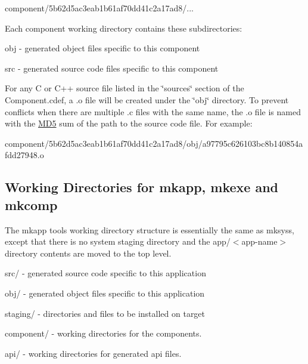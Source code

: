 \begin{DoxyItemize}
\item component/5b62d5ac3eab1b61af70dd41c2a17ad8/...
\end{DoxyItemize}

Each component working directory contains these subdirectories\+:


\begin{DoxyItemize}
\item obj -\/ generated object files specific to this component
\item src -\/ generated source code files specific to this component
\end{DoxyItemize}

For any C or C++ source file listed in the \char`\"{}sources\char`\"{} section of the Component.\+cdef, a .o file will be created under the \char`\"{}obj\char`\"{} directory. To prevent conflicts when there are multiple .c files with the same name, the .o file is named with the \hyperlink{class_m_d5}{M\+D5} sum of the path to the source code file. For example\+:


\begin{DoxyItemize}
\item component/5b62d5ac3eab1b61af70dd41c2a17ad8/obj/a97795c626103bc8b140854afdd27948.\+o
\end{DoxyItemize}\hypertarget{mkToolsDesign_mkToolsDesign_workingDirs_app_exe_comp}{}\subsection{Working Directories for mkapp, mkexe and mkcomp}\label{mkToolsDesign_mkToolsDesign_workingDirs_app_exe_comp}
The mkapp tool\textquotesingle{}s working directory structure is essentially the same as mksys\textquotesingle{}s, except that there is no system staging directory and the \textquotesingle{}app/$<$app-\/name$>$\textquotesingle{} directory contents are moved to the top level.


\begin{DoxyItemize}
\item src/ -\/ generated source code specific to this application
\item obj/ -\/ generated object files specific to this application
\item staging/ -\/ directories and files to be installed on target
\item component/ -\/ working directories for the components.
\item api/ -\/ working directories for generated api files.
\end{DoxyItemize}

